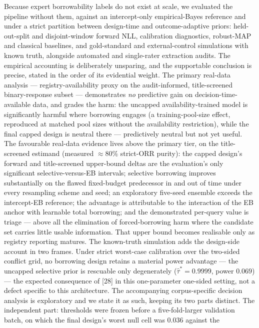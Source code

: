 \documentclass[11pt]{article}
\begin{document}
Because expert borrowability labels do not exist at scale, we evaluated the
pipeline without them, against an intercept-only empirical-Bayes reference and
under a strict partition between design-time and outcome-adaptive priors:
held-out-split and disjoint-window forward NLL, calibration diagnostics,
robust-MAP and classical baselines, and gold-standard and external-control
simulations with known truth, alongside automated and single-rater extraction
audits. The
empirical accounting is deliberately unsparing, and the supportable
conclusion is precise, stated in the order of its evidential weight. The
primary real-data analysis --- registry-availability proxy on the
audit-informed, title-screened binary-response subset --- demonstrates \emph{no}
predictive gain on decision-time-available data, and grades the harm: the
uncapped availability-trained model is significantly harmful where borrowing
engages (a training-pool-size effect, reproduced at matched pool sizes
without the availability restriction), while the final capped design is
neutral there --- predictively neutral but not yet useful. The favourable
real-data
evidence lives above the primary tier, on the title-screened estimand
(measured $\approx 80\%$ strict-ORR purity): the capped design's forward
and title-screened upper-bound deltas are the evaluation's only significant
selective-versus-EB intervals; selective borrowing improves substantially
on the flawed fixed-budget predecessor in and out of time under every
resampling scheme and seed; an exploratory five-seed ensemble exceeds the
intercept-EB reference; the advantage is attributable to the interaction of
the EB anchor with learnable total borrowing; and the demonstrated
per-query value is triage --- above all the elimination of forced-borrowing
harm where the candidate set carries little usable information. That upper
bound becomes realisable only as registry reporting matures. The
known-truth simulation adds the design-side account in two frames. Under
strict worst-case calibration over the two-sided conflict grid, no
borrowing design retains a material power advantage --- the uncapped
selective prior is rescuable only degenerately ($\hat\tau^{*} = 0.9999$,
power $0.069$) --- the expected consequence of [28] in this one-parameter
one-sided setting, not a defect specific to this architecture. The
accompanying corpus-specific decision analysis is exploratory and we state
it as such, keeping its two parts distinct. The independent part:
thresholds were frozen before a five-fold-larger validation batch, on
which the final design's worst null cell was $0.036$ against the
\end{document}
